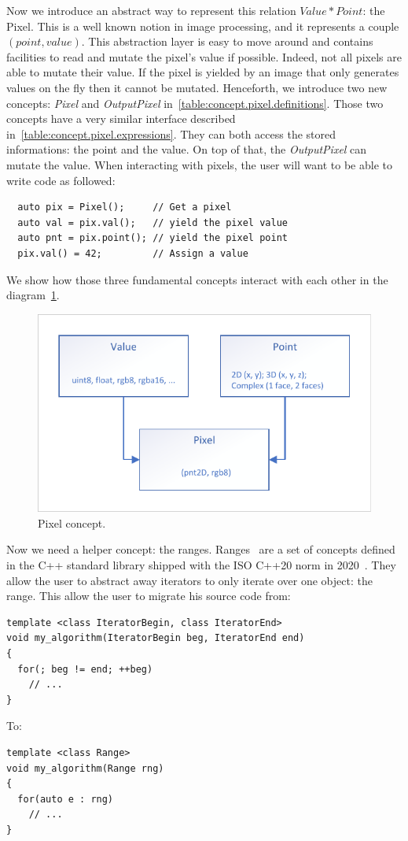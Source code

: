Now we introduce an abstract way to represent this relation $Value * Point$: the Pixel. This is a well known notion in
image processing, and it represents a couple $(point, value)$. This abstraction layer is easy to move around and
contains facilities to read and mutate the pixel's value if possible. Indeed, not all pixels are able to mutate their
value. If the pixel is yielded by an image that only generates values on the fly then it cannot be mutated. Henceforth,
we introduce two new concepts: \emph{Pixel} and \emph{OutputPixel} in~\cref{table:concept.pixel.definitions}. Those two
concepts have a very similar interface described in~\cref{table:concept.pixel.expressions}. They can both access the
stored informations: the point and the value. On top of that, the \emph{OutputPixel} can mutate the value. When
interacting with pixels, the user will want to be able to write code as followed:
\begin{verbatim}
  auto pix = Pixel();     // Get a pixel
  auto val = pix.val();   // yield the pixel value
  auto pnt = pix.point(); // yield the pixel point
  pix.val() = 42;         // Assign a value
\end{verbatim}

We show how those three fundamental concepts interact with each other in the diagram~\cref{fig:concept.pixel}.

\begin{figure}[htbp]
  \centering
  \includegraphics[width=.8\linewidth]{figs/concepts/pixel.pdf}
  \caption{Pixel concept.}
  \label{fig:concept.pixel}
\end{figure}

Now we need a helper concept: the ranges.
Ranges~\parencite{niebler.2014.ranges,niebler.2018.ranges,niebler.2018.deepranges,niebler.2018.mergingranges} are a set
of concepts defined in the C++ standard library shipped with the ISO C++20 norm in 2020~\parencite{iso.2020.cpp}. They
allow the user to abstract away iterators to only iterate over one object: the range. This allow the user to migrate his
source code from:
\begin{verbatim}
template <class IteratorBegin, class IteratorEnd>
void my_algorithm(IteratorBegin beg, IteratorEnd end)
{
  for(; beg != end; ++beg)
    // ...
}
\end{verbatim}
To:
\begin{verbatim}
template <class Range>
void my_algorithm(Range rng)
{
  for(auto e : rng)
    // ...
}
\end{verbatim}


